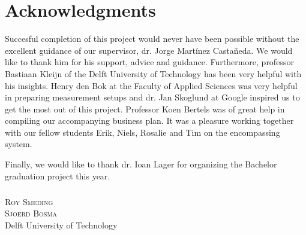 \documentclass[a4paper, notitlepage]{report}
\begin{document}
\cleardoublepage
\chapter*{Acknowledgments}
Succesful completion of this project would never have been possible without the excellent guidance of our supervisor, dr. Jorge Mart\'inez Casta\~neda. We would like to thank him for his support, advice and guidance.
Furthermore, professor Bastiaan Kleijn of the Delft University of Technology has been very helpful with his insights. Henry den Bok at the Faculty of Applied Sciences was very helpful in preparing measurement setups and dr. Jan Skoglund at Google inspired us to get the most out of this project. Professor Koen Bertels was of great help in compiling our accompanying business plan. It was a pleasure working together with our fellow students Erik, Niels, Rosalie and Tim on the encompassing system.

Finally, we would like to thank dr. Ioan Lager for organizing the Bachelor graduation project this year. 
\paragraph*{}
\begin{flushright}
	\textsc{Roy Smeding} \\
	\textsc{Sjoerd Bosma} \\
	\vspace{8pt}
	Delft University of Technology
\end{flushright}
\end{document}
